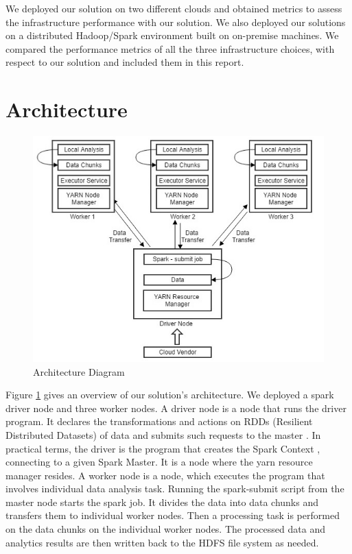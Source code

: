 \documentclass[9pt,twocolumn,twoside]{../../styles/osajnl}
\begin{document}
We deployed our solution on two different clouds and obtained metrics to assess the infrastructure performance with our solution.  We also deployed our solutions on a distributed Hadoop/Spark environment built on on-premise machines. We compared the performance metrics of all the three infrastructure choices, with respect to our solution  and included them in this report.

\section{Architecture}

\begin{figure}[h]
\centering
\includegraphics[width=\linewidth]{images/Architecture_Diagram}
\caption{Architecture Diagram}
\label{fig:arch}
\end{figure}

Figure \ref{fig:arch} gives an overview of our solution’s architecture. We deployed a spark driver node and three worker nodes. A driver node is a node that runs the driver program. It declares the transformations and actions on RDDs (Resilient Distributed Datasets) of data and submits such requests to the master \cite{www-rdd}. In practical terms, the driver is the program that creates the Spark Context \cite{www-sparkcontext}, connecting to a given Spark Master. It is a node where the yarn resource manager resides. A worker node is a node, which executes the program that involves individual data analysis task.
Running the spark-submit script from the master node starts the spark job. It divides the data into data chunks and transfers them to individual worker nodes. Then a processing task is performed on the data chunks on the individual worker nodes. The processed data and analytics results are then written back to the HDFS file system as needed.
\end{document}
